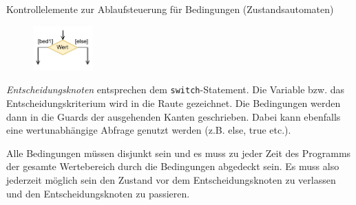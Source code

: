 \begin{diag}{Kontrollelemente zur Ablaufsteuerung für Bedingungen (Zustandsautomaten)}
    \begin{figure}
        \centering
        \includegraphics[width=0.2\textwidth]{includes/figures/defi_diagrams_state_if.pdf}
    \end{figure}
    \emph{Entscheidungsknoten} entsprechen dem \texttt{switch}-Statement.
    Die Variable bzw. das Entscheidungskriterium wird in die Raute gezeichnet.
    Die Bedingungen werden dann in die Guards der ausgehenden Kanten geschrieben.
    Dabei kann ebenfalls eine wertunabhängige Abfrage genutzt werden (z.B. else, true etc.).

    Alle Bedingungen müssen disjunkt sein und es muss zu jeder Zeit des Programms der gesamte Wertebereich durch die Bedingungen abgedeckt sein.
    Es muss also jederzeit möglich sein den Zustand vor dem Entscheidungsknoten zu verlassen und den Entscheidungsknoten zu passieren.
\end{diag}

